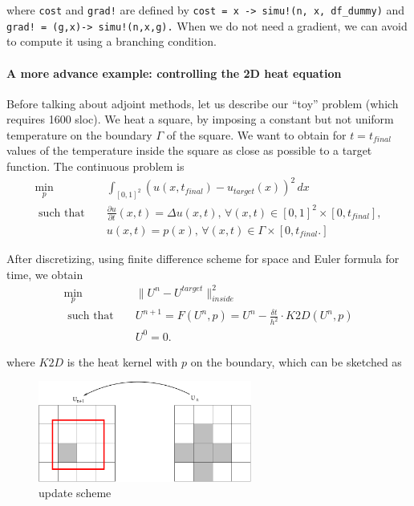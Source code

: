 \documentclass[11pt]{article}
\begin{document}
where \texttt{cost} and \texttt{grad!} are defined by \texttt{cost\ =\ x\ -\textgreater{}\ simu!(n,\ x,\ df\_dummy)} and \texttt{grad!\ =\ (g,x)-\textgreater{}\ simu!(n,x,g).}
When we do not need a gradient, we can avoid to compute it using a branching condition.

\hypertarget{a-more-advance-example-controlling-the-2d-heat-equation}{%
\paragraph{A more advance example: controlling the 2D heat
equation}\label{a-more-advance-example-controlling-the-2d-heat-equation}}

Before talking about adjoint methods, let us describe our ``toy'' problem (which requires 1600 sloc).
We heat a square, by imposing a constant but not uniform temperature 
on the boundary \(\Gamma\) of the square. We want to obtain 
for \(t=t_{final}\) values of the temperature inside the square as close as possible 
to a target function. The continuous problem is
\begin{eqnarray}
   \min_p && \int_{[0,1]^2} (u(x,t_{final}) - u_{target}(x))^2 \, dx \\
   \mbox { such that }     && \frac{\partial u}{\partial t} (x,t) = \Delta u(x,t), \, \forall (x,t) \in [0,1]^2 \times [0,t_{final}], \\ 
    && u(x,t) = p(x), \,  \forall  (x,t) \in \Gamma \times [0,t_{final}.]
\end{eqnarray}

After discretizing, using finite difference scheme for space and Euler formula for time, we obtain 
\begin{eqnarray}
   \min_p &&  \|U^n- U^{target}\|^2_{inside}  \\
   \mbox { such that }     && U^{n+1} = F(U^n,p) = U^n - \frac{\delta t}{h^2} \cdot K2D(U^n,p) \\
                           && U^0 = 0. 
\end{eqnarray}

where \(K2D\) is the heat kernel with \(p\) on the boundary, which can be sketched as

\begin{figure}
\centering
    \includegraphics[width=70mm]{figures/buffer.pdf}
\caption{update scheme}
\end{figure}
\end{document}
